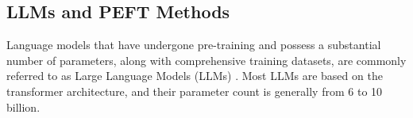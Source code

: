 
\subsection{LLMs and PEFT Methods}
Language models that have undergone pre-training and possess a substantial number of parameters, along with comprehensive training datasets, are commonly referred to as Large Language Models (LLMs) \cite{raffelExploringLimitsTransfer2023, zhangOPTOpenPretrained2022, touvronLLaMAOpenEfficient2023}. Most LLMs are based on the transformer architecture, and their parameter count is generally from 6 to 10 billion. %


